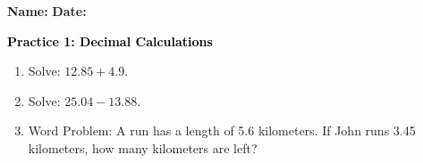 \documentclass[12pt, letterpaper, fleqn]{article}
\begin{document}
\textbf{Name:} \underline{\hspace{5cm}}
\hfill
\textbf{Date:} \underline{\hspace{3cm}}\\

\begin{tcolorbox}[colback=customteal!20]
    \large\textcolor{black}{\textbf{Practice 1: Decimal Calculations}}
\end{tcolorbox}
\begin{enumerate}[itemsep=3.5cm, leftmargin=0.6cm]
\item Solve: $12.85 + 4.9$.
\vspace{3.5cm}
\item Solve: $25.04 - 13.88$.
\vspace{3.5cm}
\item Word Problem: A run has a length of 5.6 kilometers. If John runs 3.45 kilometers, how many kilometers are left?
\end{enumerate}
\end{document}
